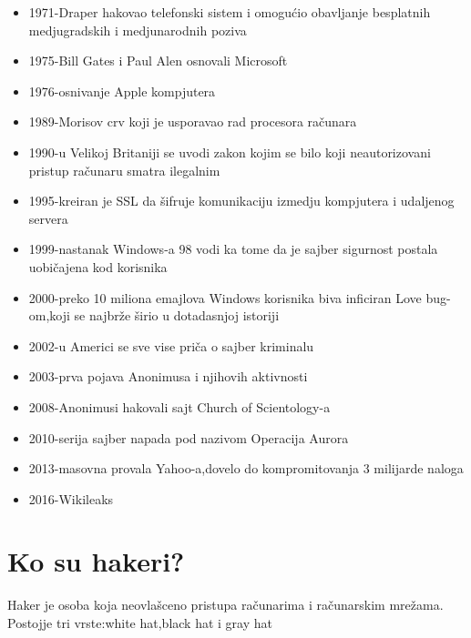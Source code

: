 \documentclass[a4paper]{article}
\begin{document}
\begin{itemize}
\item 1971-Draper hakovao telefonski sistem i omogućio obavljanje besplatnih medjugradskih i medjunarodnih poziva
\item 1975-Bill Gates i Paul Alen osnovali Microsoft
\item 1976-osnivanje Apple kompjutera
\item 1989-Morisov crv koji je usporavao rad procesora računara
\item 1990-u Velikoj Britaniji se uvodi zakon kojim se bilo koji neautorizovani pristup računaru smatra ilegalnim
\item 1995-kreiran je SSL da šifruje komunikaciju izmedju kompjutera i udaljenog servera
\item 1999-nastanak Windows-a 98 vodi ka tome da je sajber sigurnost postala uobičajena kod korisnika
\item 2000-preko 10 miliona emajlova Windows korisnika biva inficiran Love bug-om,koji se najbrže širio u dotadasnjoj istoriji
\item 2002-u Americi se sve vise priča o sajber kriminalu
\item 2003-prva pojava Anonimusa i njihovih aktivnosti
\item 2008-Anonimusi hakovali sajt Church of Scientology-a
\item 2010-serija sajber napada pod nazivom Operacija Aurora 
\item 2013-masovna provala Yahoo-a,dovelo do kompromitovanja 3 milijarde naloga
\item 2016-Wikileaks

\end{itemize} 

\newpage


\section{Ko su hakeri?}	
\label{sec:naslov1}
Haker je osoba koja neovlašceno pristupa računarima i računarskim mrežama.
\newline
Postojje tri vrste:white hat,black hat i gray hat
\end{document}

